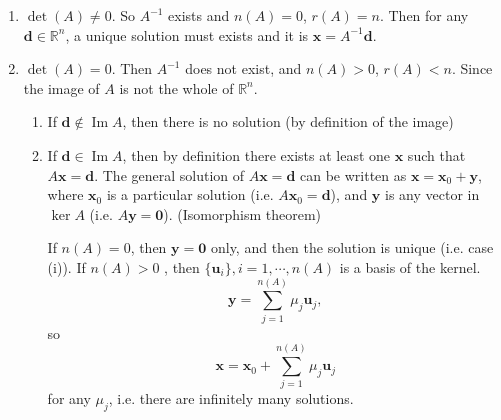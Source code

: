 \documentclass[a4paper]{article}
\theoremstyle{definition}
\newcommand{\mb}[1]{\mathbf{#1}}
\newcommand{\R}{\mathbb{R}}
\DeclareMathOperator\im{Im}
\begin{document}
\begin{enumerate}
\item $\det(A) \not= 0$. So $A^{-1}$ exists and $n(A) = 0$, $r(A) = n$. Then for any $\mb{d}\in \R^n$, a unique solution must exists and it is $\mb{x} = A^{-1}\mb{d}$.
\item $\det(A) = 0$. Then $A^{-1}$ does not exist, and $n(A) > 0$, $r(A) < n$. Since the image of $A$ is not the whole of $\R^n$.
  \begin{enumerate}
  \item If $\mb{d}\not\in \im A$, then there is no solution (by definition of the image)
  \item If $\mb{d}\in \im A$, then by definition there exists at least one $\mb{x}$ such that $A\mb{x} = \mb{d}$. The general solution of $A\mb{x} = \mb{d}$  can be written as $\mb{x} = \mb{x}_0 + \mb{y}$, where $\mb{x}_0$ is a particular solution (i.e. $A\mb{x}_0 = \mb{d}$), and $\mb{y}$ is any vector in $\ker A$ (i.e. $A\mb{y} = \mb{0}$). (Isomorphism theorem)

    If $n(A) = 0$, then $\mb{y = 0}$ only, and then the solution is unique (i.e. case (i)). If $n(A) > 0$ , then $\{\mb{u}_i\}, i = 1, \cdots, n(A)$ is a basis of the kernel.
\[
\mb{y} = \sum_{j = 1}^{n(A)} \mu_j \mb{u}_j,
\]
so
\[
\mb{x} = \mb{x}_0 + \sum_{j = 1}^{n(A)} \mu_j \mb{u}_j
\]
for any $\mu_j$, i.e. there are infinitely many solutions.
  \end{enumerate}
\end{enumerate}
\end{document}
